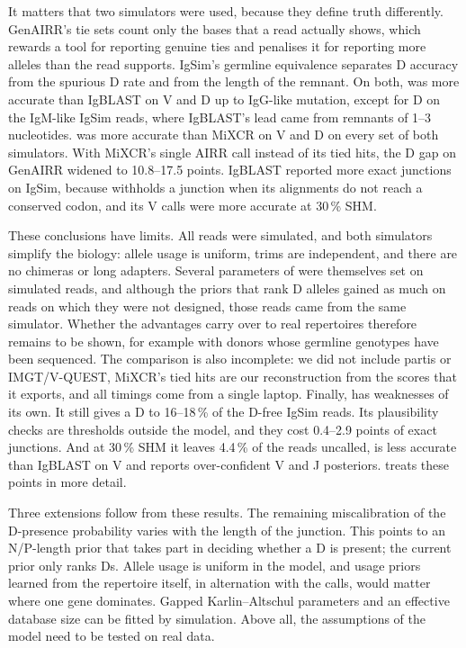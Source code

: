 \documentclass[11pt,a4paper]{article}
\begin{document}
It matters that two simulators were used, because they define truth
differently. GenAIRR's tie sets count only the bases that a read actually
shows, which rewards a tool for reporting genuine ties and penalises it for
reporting more alleles than the read supports. IgSim's germline equivalence
separates D accuracy from the spurious D rate and from the length of the
remnant. On both, \swig{} was more accurate than IgBLAST on V and D up to
IgG-like mutation, except for D on the IgM-like IgSim reads, where
IgBLAST's lead came from remnants of 1--3 nucleotides. \swig{} was more
accurate than MiXCR on V and D on every set of both simulators. With MiXCR's
single AIRR call instead of its tied hits, the D gap on GenAIRR widened to
10.8--17.5 points. IgBLAST reported more exact junctions on
IgSim, because \swig{} withholds a junction when its alignments do not reach
a conserved codon, and its V calls were more accurate at 30\,\% SHM.

These conclusions have limits. All reads were simulated, and both simulators
simplify the biology: allele usage is uniform, trims are independent, and
there are no chimeras or long adapters. Several parameters of \swig{} were
themselves set on simulated reads, and although the priors that rank D
alleles gained as much on reads on which they were not designed, those reads
came from the same simulator. Whether the advantages carry over to real
repertoires therefore remains to be shown, for example with donors whose
germline genotypes have been sequenced. The comparison is also incomplete:
we did not include partis or IMGT/V-QUEST, MiXCR's tied hits are our
reconstruction from the scores that it exports, and all timings come from a
single laptop. Finally, \swig{} has weaknesses of its own. It still gives a
D to 16--18\,\% of the D-free IgSim reads. Its plausibility checks are
thresholds outside the model, and they cost 0.4--2.9 points of exact
junctions. And at 30\,\% SHM it leaves 4.4\,\% of the reads uncalled, is
less accurate than IgBLAST on V and reports over-confident V and J
posteriors.  treats these points in more detail.

Three extensions follow from these results. The remaining miscalibration of
the D-presence probability varies with the length of the junction. This
points to an N/P-length prior that takes part in deciding whether a D is
present; the current prior only ranks Ds. Allele usage is uniform in the
model, and usage priors learned from the repertoire itself, in alternation
with the calls, would matter where one gene dominates. Gapped
Karlin--Altschul parameters and an effective database size can be fitted by
simulation. Above all, the assumptions of the model need to be tested on
real data.
\end{document}
